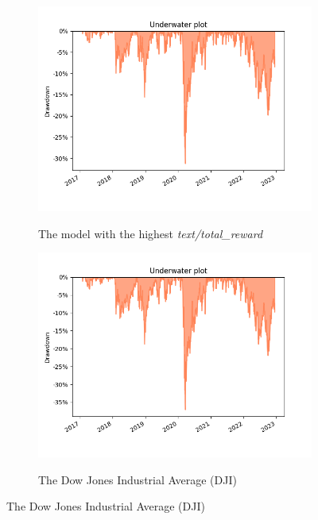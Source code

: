 \documentclass[../xlapes02]{subfiles}
\begin{document}
    \begin{figure}
        \begin{subfigure}[t]{\experimentimgwidth\textwidth}
            \centering
            \includegraphics[width=\linewidth]{image/figure/drawdown_underwater_max}
            \label{fig:drawdown_underwater_max}
            \caption{The model with the highest \emph{text/total\_reward}}
        \end{subfigure}
        \hfill
        \begin{subfigure}[t]{\experimentimgwidth\textwidth}
            \centering
            \includegraphics[width=\linewidth]{image/figure/drawdown_underwater_dji}
            \label{fig:drawdown_underwater_dji}
            \caption{The Dow Jones Industrial Average (DJI)}
        \end{subfigure}


\end{figure}
\end{document}
